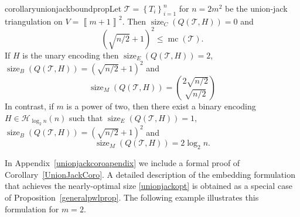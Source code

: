 \documentclass[mnsc]{informs3}
\newcommand{\set}[1]{\left\{#1\right\}}                     %
\newcommand{\bra}[1]{\left(#1\right)}
\newcommand{\sidx}[1]{\left\llbracket     #1 \right\rrbracket}
\DeclareMathOperator{\size}{size}
\DeclareMathOperator{\mmc}{mc}
\begin{document}
\begin{restatable}{corollary}{unionjackboundprop}\label{UnionJackCoro}Let $\mathcal{T}=\set{T_i}_{i=1}^n$ for $n=2 m^2$ be the union-jack triangulation on $V=\sidx{m+1}^2$.  Then $\size_C\bra{Q\bra{\mathcal{T},H}}=0$ and
\[
\bra{\sqrt{n/2}+1}^2\leq \mmc\bra{\mathcal{\mathcal{T}}}.
\]
If $H$ is the unary encoding then $\size_E\bra{Q\bra{\mathcal{T},H}}=2$, $\size_B\bra{Q\bra{\mathcal{T},H}}=\bra{\sqrt{n/2}+1}^2$ and 
\[\size_M\bra{Q\bra{\mathcal{T},H}}= \binom{2\sqrt{n/2}}{\sqrt{n/2}}\]
In contrast, if $m$ is a power of two, then there exist a binary encoding $H\in \mathcal{H}_{\log_2 n}(n)$ such that $\size_E\bra{Q\bra{\mathcal{T},H}}=1$, $\size_B\bra{Q\bra{\mathcal{T},H}}=\bra{\sqrt{n/2}+1}^2$ and 
\begin{equation}\label{unionjackopt}
\size_M\bra{Q\bra{\mathcal{T},H}} =  2  \log_2 n.
\end{equation}
\end{restatable}
In Appendix~\ref{unionjackcoroapendix} we include a formal proof of Corollary~\ref{UnionJackCoro}. A detailed description of the embedding formulation that achieves the nearly-optimal size \eqref{unionjackopt} is obtained as a special case of Proposition~\ref{generalpwlprop}. The following example illustrates this formulation for $m=2$.
\end{document}
